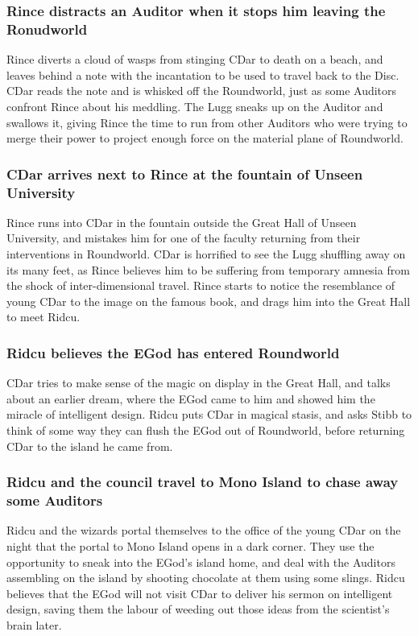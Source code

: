 \subsubsection{\Gls{Rince} distracts an Auditor when it stops him leaving the Ronudworld}
\Gls{Rince} diverts a cloud of wasps from stinging \Gls{CDar} to death on a beach, and leaves behind
a note with the incantation to be used to travel back to the Disc. \Gls{CDar} reads the note and
is whisked off the Roundworld, just as some Auditors confront \Gls{Rince} about his meddling.
The \Gls{Lugg} sneaks up on the Auditor and swallows it, giving \Gls{Rince} the time to run from
other Auditors who were trying to merge their power to project enough force on the material plane of
Roundworld.

\subsubsection{\Gls{CDar} arrives next to \Gls{Rince} at the fountain of Unseen University}
\Gls{Rince} runs into \Gls{CDar} in the fountain outside the Great Hall of Unseen University, and
mistakes him for one of the faculty returning from their interventions in Roundworld. \Gls{CDar} is
horrified to see the \Gls{Lugg} shuffling away on its many feet, as \Gls{Rince} believes him to be
suffering from temporary amnesia from the shock of inter-dimensional travel. \Gls{Rince} starts to
notice the resemblance of young \Gls{CDar} to the image on the famous book, and drags him into the
Great Hall to meet \Gls{Ridcu}.

\subsubsection{\Gls{Ridcu} believes the \Gls{EGod} has entered Roundworld}
\Gls{CDar} tries to make sense of the magic on display in the Great Hall, and talks about an earlier
dream, where the \Gls{EGod} came to him and showed him the miracle of intelligent design.
\Gls{Ridcu} puts \Gls{CDar} in magical stasis, and asks \Gls{Stibb} to think of some way they can
flush the \Gls{EGod} out of Roundworld, before returning \Gls{CDar} to the island he came from.

\subsubsection{\Gls{Ridcu} and the council travel to Mono Island to chase away some Auditors}
\Gls{Ridcu} and the wizards portal themselves to the office of the young \Gls{CDar} on the night
that the portal to Mono Island opens in a dark corner. They use the opportunity to sneak into the
\Gls{EGod}'s island home, and deal with the Auditors assembling on the island by shooting chocolate
at them using some slings. \Gls{Ridcu} believes that the \Gls{EGod} will not visit \Gls{CDar} to
deliver his sermon on intelligent design, saving them the labour of weeding out those ideas from
the scientist's brain later.

